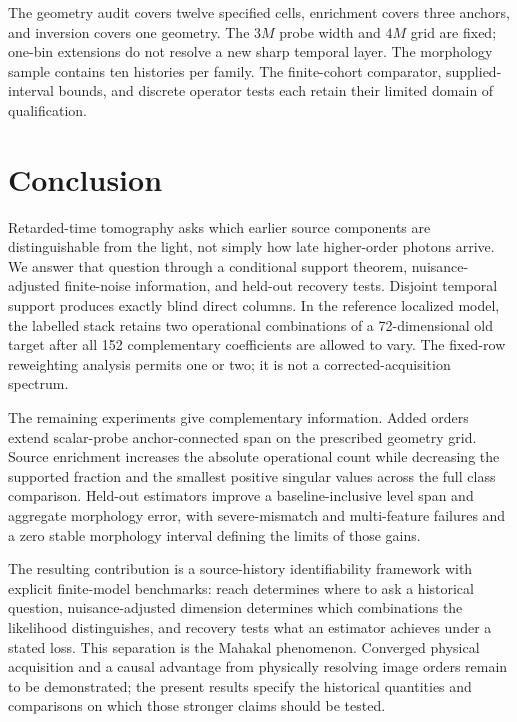 The geometry audit covers twelve specified cells, enrichment covers three anchors, and inversion covers one geometry. The $3M$ probe width and $4M$ grid are fixed; one-bin extensions do not resolve a new sharp temporal layer. The morphology sample contains ten histories per family. The finite-cohort comparator, supplied-interval bounds, and discrete operator tests each retain their limited domain of qualification.

\section{Conclusion}
Retarded-time tomography asks which earlier source components are distinguishable from the light, not simply how late higher-order photons arrive. We answer that question through a conditional support theorem, nuisance-adjusted finite-noise information, and held-out recovery tests. Disjoint temporal support produces exactly blind direct columns. In the reference localized model, the labelled stack retains two operational combinations of a 72-dimensional old target after all 152 complementary coefficients are allowed to vary. The fixed-row reweighting analysis permits one or two; it is not a corrected-acquisition spectrum.

The remaining experiments give complementary information. Added orders extend scalar-probe anchor-connected span on the prescribed geometry grid. Source enrichment increases the absolute operational count while decreasing the supported fraction and the smallest positive singular values across the full class comparison. Held-out estimators improve a baseline-inclusive level span and aggregate morphology error, with severe-mismatch and multi-feature failures and a zero stable morphology interval defining the limits of those gains.

The resulting contribution is a source-history identifiability framework with explicit finite-model benchmarks: reach determines where to ask a historical question, nuisance-adjusted dimension determines which combinations the likelihood distinguishes, and recovery tests what an estimator achieves under a stated loss. This separation is the Mahakal phenomenon. Converged physical acquisition and a causal advantage from physically resolving image orders remain to be demonstrated; the present results specify the historical quantities and comparisons on which those stronger claims should be tested.

